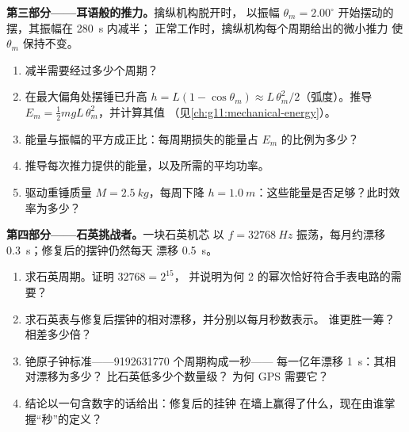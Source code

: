 \begin{problem}
\medskip
\noindent\textbf{第三部分——耳语般的推力。}擒纵机构脱开时，
以振幅 $\theta_m = 2.00^\circ$ 开始摆动的摆，其振幅在 \qty{280}{s} 内减半；
正常工作时，擒纵机构每个周期给出的微小推力
使 $\theta_m$ 保持不变。
\begin{enumerate}[resume]
  \item 减半需要经过多少个周期？
  \item 在最大偏角处摆锤已升高 $h = L(1 - \cos\theta_m)
        \approx L\,\theta_m^2/2$（弧度）。推导 $E_m = \tfrac12
        m g L\,\theta_m^2$，并计算其值
        （见\cref{ch:g11:mechanical-energy}）。
  \item 能量与振幅的平方成正比：每周期损失的能量占
        $E_m$ 的比例为多少？
  \item 推导每次推力提供的能量，以及所需的平均功率。
  \item 驱动重锤质量 $M = \qty{2.5}{kg}$，每周下降 $h =
        \qty{1.0}{m}$：这些能量是否足够？此时效率为多少？
\end{enumerate}

\medskip
\noindent\textbf{第四部分——石英挑战者。}一块石英机芯
以 $f = \qty{32768}{Hz}$ 振荡，每月约漂移
\qty{0.3}{s}；修复后的摆钟仍然每天
漂移 \qty{0.5}{s}。
\begin{enumerate}[resume]
  \item 求石英周期。证明 $\num{32768} = 2^{15}$，
        并说明为何 2 的幂次恰好符合手表电路的需要？
  \item 求石英表与修复后摆钟的相对漂移，并分别以每月秒数表示。
        谁更胜一筹？相差多少倍？
  \item 铯原子钟标准——\num{9192631770} 个周期构成一秒——
        每一亿年漂移 \qty{1}{s}：其相对漂移为多少？
        比石英低多少个数量级？
        为何 GPS 需要它？
  \item 结论以一句含数字的话给出：修复后的挂钟
        在墙上赢得了什么，现在由谁掌握“秒”的定义？
\end{enumerate}
\end{problem}
